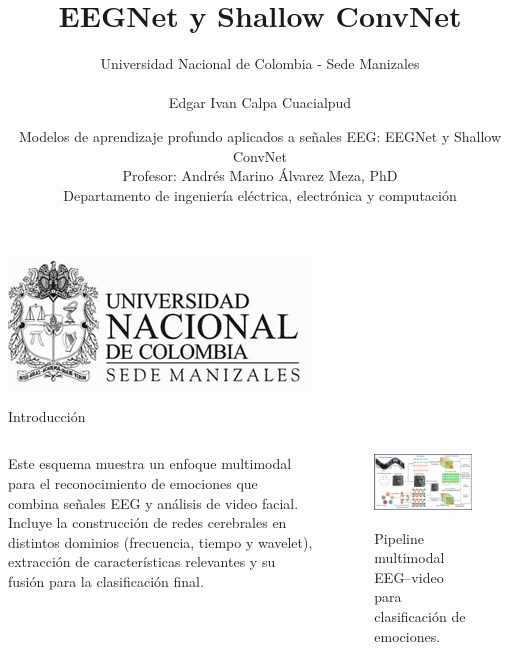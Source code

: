 \documentclass{beamer}
\title{EEGNet y Shallow ConvNet}
\author[Edgar Ivan Calpa Cuacialpud]{Universidad Nacional de Colombia - Sede Manizales \\\\ Edgar Ivan Calpa Cuacialpud \small }
\date{Modelos de aprendizaje profundo aplicados a señales EEG: EEGNet y Shallow ConvNet\\ 
Profesor: Andrés Marino Álvarez Meza, PhD\\ 
Departamento de ingeniería eléctrica, electrónica y computación }
\begin{document}
\begin{frame}
    \titlepage
    \vspace{0cm} %
    \begin{center}
        \includegraphics[width=0.3\linewidth]{UNM.png}
    \end{center}
\end{frame}


\begin{frame}{Introducción}
\begin{columns}[T]

    \begin{column}{0.55\textwidth}
Este esquema muestra un enfoque multimodal para el reconocimiento de emociones que combina señales EEG y análisis de video facial.  
Incluye la construcción de redes cerebrales en distintos dominios (frecuencia, tiempo y wavelet), extracción de características relevantes y su fusión para la clasificación final.
    \end{column}

    \begin{column}{0.48\textwidth}
        \begin{figure}
            \centering
            \href{https://www.nature.com/articles/s41598-025-98404-2/figures/1}{%
                \includegraphics[width=\linewidth]{figura_emotrans.png}%
            }
            \caption{\small Pipeline multimodal EEG–video para clasificación de emociones.}
            \label{fig:multimodal_emotion}
        \end{figure}
    \end{column}

\end{columns}
\end{frame}
\end{document}
